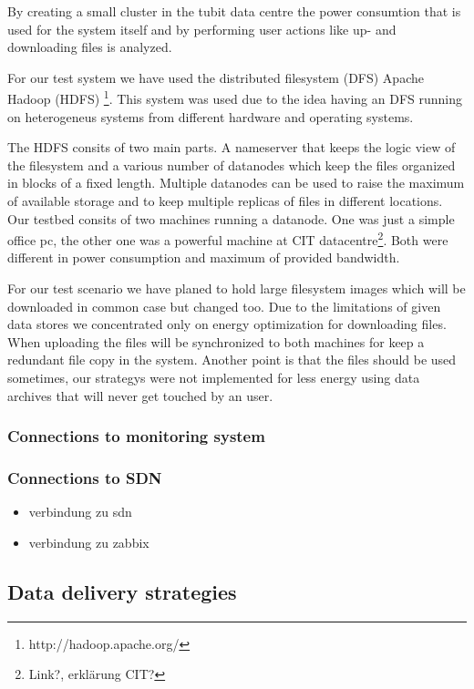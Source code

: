 By creating a small cluster in the tubit data centre the power consumtion that is used for the system itself and by performing user actions like up- and downloading files is analyzed.

For our test system we have used the distributed filesystem (DFS) Apache Hadoop\textsuperscript{\textregistered} (HDFS) \footnote{http://hadoop.apache.org/}. This system was used due to the idea having an DFS running on heterogeneus systems from different hardware and operating systems. 

The HDFS consits of two main parts. A nameserver that keeps the logic view of the filesystem and a various number of datanodes which keep the files organized in blocks of a fixed length. Multiple datanodes can be used to raise the maximum of available storage and to keep multiple replicas of files in different locations. Our testbed consits of two machines running a datanode. One was just a simple office pc, the other one was a powerful machine at CIT datacentre\footnote{Link?, erklärung CIT?}. Both were different in power consumption and maximum of provided bandwidth. 


For our test scenario we have planed to hold large filesystem images which will be downloaded in common case but changed too. Due to the limitations of given data stores we concentrated only on energy optimization for downloading files. When uploading the files will be synchronized to both machines for keep a redundant file copy in the system.
Another point is that the files should be used sometimes, our strategys were not implemented for less energy using data archives that will never get touched by an user.

\subsubsection{Connections to monitoring system}

\subsubsection{Connections to SDN}

\begin{itemize}
	\item verbindung zu sdn
	\item verbindung zu zabbix
\end{itemize}

\subsection{Data delivery strategies}


